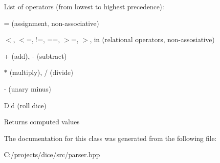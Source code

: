 List of operators (from lowest to highest precedence)\+:
\begin{DoxyEnumerate}
\item = (assignment, non-\/associative)
\item $<$, $<$=, !=, ==, $>$=, $>$, in (relational operators, non-\/assosiative)
\item + (add), -\/ (subtract)
\item $\ast$ (multiply), / (divide)
\item -\/ (unary minus)
\item D$\vert$d (roll dice)
\end{DoxyEnumerate}

\begin{DoxyReturn}{Returns}
computed values 
\end{DoxyReturn}


The documentation for this class was generated from the following file\+:\begin{DoxyCompactItemize}
\item 
C\+:/projects/dice/src/parser.\+hpp\end{DoxyCompactItemize}
